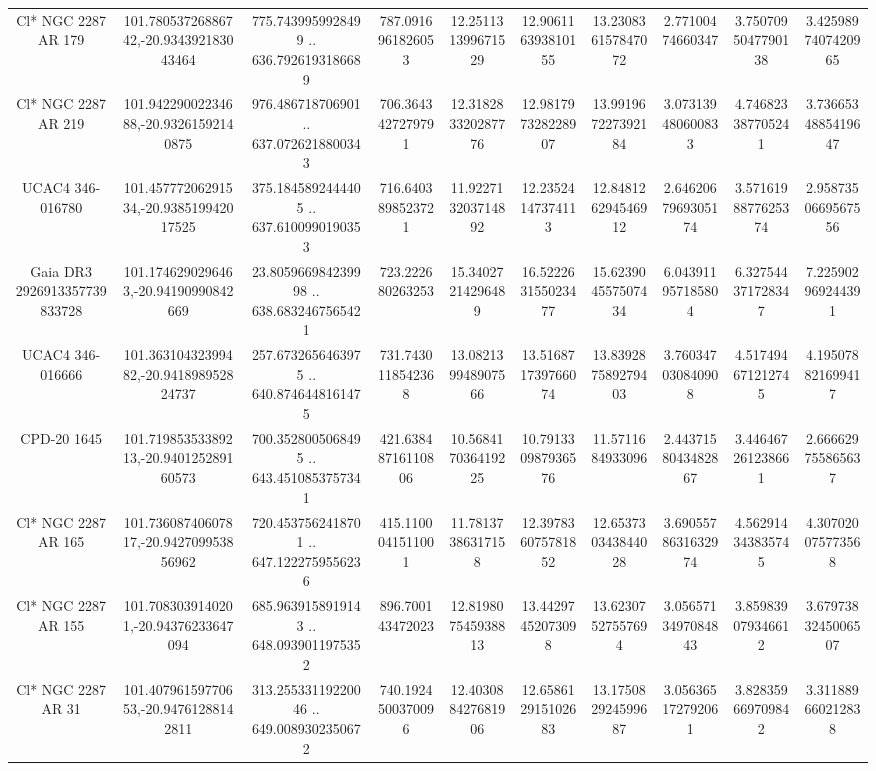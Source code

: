 \begin{table}
\begin{tabular}{cccccccccc}
Cl* NGC 2287     AR     179 & 101.78053726886742,-20.934392183043464 & 775.7439959928499 .. 636.7926193186689 & 787.0916961826053 & 12.251131399671529 & 12.906116393810155 & 13.230836157847072 & 2.77100474660347 & 3.7507095047790138 & 3.4259897407420965 \\
Cl* NGC 2287     AR     219 & 101.94229002234688,-20.93261592140875 & 976.486718706901 .. 637.0726218800343 & 706.3643427279791 & 12.318283320287776 & 12.981797328228907 & 13.991967227392184 & 3.073139480600833 & 4.746823387705241 & 3.7366534885419647 \\
UCAC4 346-016780 & 101.45777206291534,-20.938519942017525 & 375.1845892444405 .. 637.6100990190353 & 716.6403898523721 & 11.922713203714892 & 12.23524147374113 & 12.848126294546912 & 2.6462067969305174 & 3.5716198877625374 & 2.9587350669567556 \\
Gaia DR3 2926913357739833728 & 101.1746290296463,-20.94190990842669 & 23.805966984239998 .. 638.6832467565421 & 723.222680263253 & 15.34027214296489 & 16.522263155023477 & 15.623904557507434 & 6.043911957185804 & 6.327544371728347 & 7.225902969244391 \\
UCAC4 346-016666 & 101.36310432399482,-20.941898952824737 & 257.6732656463975 .. 640.8746448161475 & 731.7430118542368 & 13.082139948907566 & 13.516871739766074 & 13.839287589279403 & 3.760347030840908 & 4.517494671212745 & 4.195078821699417 \\
CPD-20  1645 & 101.71985353389213,-20.940125289160573 & 700.3528005068495 .. 643.4510853757341 & 421.63848716110806 & 10.568417036419225 & 10.791330987936576 & 11.5711684933096 & 2.4437158043482867 & 3.446467261238661 & 2.666629755865637 \\
Cl* NGC 2287     AR     165 & 101.73608740607817,-20.942709953856962 & 720.4537562418701 .. 647.1222759556236 & 415.1100041511001 & 11.78137386317158 & 12.397836075781852 & 12.653730343844028 & 3.6905578631632974 & 4.562914343835745 & 4.307020075773568 \\
Cl* NGC 2287     AR     155 & 101.7083039140201,-20.94376233647094 & 685.9639158919143 .. 648.0939011975352 & 896.700143472023 & 12.819807545938813 & 13.44297452073098 & 13.62307527557694 & 3.0565713497084843 & 3.859839079346612 & 3.6797383245006507 \\
Cl* NGC 2287     AR      31 & 101.40796159770653,-20.94761288142811 & 313.25533119220046 .. 649.0089302350672 & 740.1924500370096 & 12.403088427681906 & 12.658612915102683 & 13.175082924599687 & 3.056365172792061 & 3.828359669709842 & 3.311889660212838 \\

\end{tabular}
\end{table}
